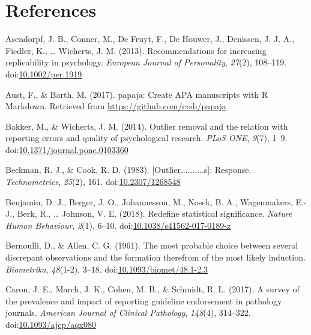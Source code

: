 \documentclass[english,,man]{apa6}
\theoremstyle{definition}
\theoremstyle{definition}
\theoremstyle{definition}
\theoremstyle{remark}
\begin{document}
\section{References}\label{references}

\setlength{\parindent}{-0.5in} \setlength{\leftskip}{0.5in}

\hypertarget{refs}{}
\hypertarget{ref-Asendorpf2012}{}
Asendorpf, J. B., Conner, M., De Fruyt, F., De Houwer, J., Denissen, J.
J. A., Fiedler, K., \ldots{} Wicherts, J. M. (2013). Recommendations for
increasing replicability in psychology. \emph{European Journal of
Personality}, \emph{27}(2), 108--119.
doi:\href{https://doi.org/10.1002/per.1919}{10.1002/per.1919}

\hypertarget{ref-Aust2017}{}
Aust, F., \& Barth, M. (2017). papaja: Create APA manuscripts with R
Markdown. Retrieved from \url{https://github.com/crsh/papaja}

\hypertarget{ref-Bakker2014}{}
Bakker, M., \& Wicherts, J. M. (2014). Outlier removal and the relation
with reporting errors and quality of psychological research. \emph{PLoS
ONE}, \emph{9}(7), 1--9.
doi:\href{https://doi.org/10.1371/journal.pone.0103360}{10.1371/journal.pone.0103360}

\hypertarget{ref-Beckman1983}{}
Beckman, R. J., \& Cook, R. D. (1983). {[}Outlier..........s{]}:
Response. \emph{Technometrics}, \emph{25}(2), 161.
doi:\href{https://doi.org/10.2307/1268548}{10.2307/1268548}

\hypertarget{ref-Benjamin2018}{}
Benjamin, D. J., Berger, J. O., Johannesson, M., Nosek, B. A.,
Wagenmakers, E.-J., Berk, R., \ldots{} Johnson, V. E. (2018). Redefine
statistical significance. \emph{Nature Human Behaviour}, \emph{2}(1),
6--10.
doi:\href{https://doi.org/10.1038/s41562-017-0189-z}{10.1038/s41562-017-0189-z}

\hypertarget{ref-Bernoulli1777}{}
Bernoulli, D., \& Allen, C. G. (1961). The most probable choice between
several discrepant observations and the formation therefrom of the most
likely induction. \emph{Biometrika}, \emph{48}(1-2), 3--18.
doi:\href{https://doi.org/10.1093/biomet/48.1-2.3}{10.1093/biomet/48.1-2.3}

\hypertarget{ref-Caron2017}{}
Caron, J. E., March, J. K., Cohen, M. B., \& Schmidt, R. L. (2017). A
survey of the prevalence and impact of reporting guideline endorsement
in pathology journals. \emph{American Journal of Clinical Pathology},
\emph{148}(4), 314--322.
doi:\href{https://doi.org/10.1093/ajcp/aqx080}{10.1093/ajcp/aqx080}
\end{document}
